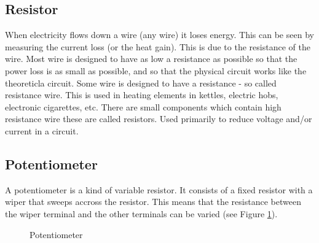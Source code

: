 \documentclass[a4]{report}
\begin{document}
	\subsection{Resistor}
	
	When electricity flows down a wire (any wire) it loses energy. This can be seen by measuring the current loss (or the heat gain). This is due to the resistance of the wire. Most wire is designed to have as low a resistance as possible so that the power loss is as small as possible, and so that the physical circuit works like the theoreticla circuit. Some wire is designed to have a resistance - so called resistance wire. This is used in heating elements in kettles, electric hobs, electronic cigarettes, etc. There are small components which contain high resistance wire these are called resistors. Used primarily to reduce voltage and/or current in a circuit.
	
	\subsection{Potentiometer}
	
	A potentiometer is a kind of variable resistor. It consists of a fixed resistor with a wiper that sweeps accross the resistor. This means that the resistance between the wiper terminal and the other terminals can be varied (see Figure \ref{figpot}).
	
	\begin{figure}[!htb]
		\centering
		\caption{Potentiometer}
		\label{figpot}
	\end{figure}
	
\end{document}
